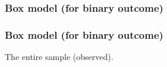 \documentclass[handout]{beamer}
\begin{document}
   \begin{frame}
   \frametitle{Box model (for binary outcome)}
   \begin{center}
   \end{center}

   \end{frame}



   \begin{frame}
   \frametitle{Box model (for binary outcome)}
   \begin{center}
   \end{center}
   The entire sample (observed).
   \end{frame}
\end{document}
